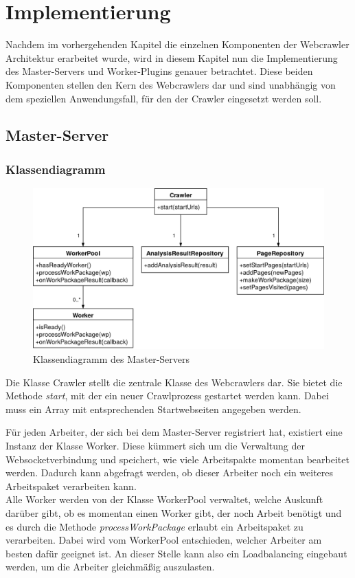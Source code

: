 \chapter{Implementierung}
Nachdem im vorhergehenden Kapitel die einzelnen Komponenten der Webcrawler Architektur erarbeitet wurde, wird in diesem Kapitel nun die Implementierung des Master-Servers und Worker-Plugins genauer betrachtet. Diese beiden Komponenten stellen den Kern des Webcrawlers dar und sind unabhängig von dem speziellen Anwendungsfall, für den der Crawler eingesetzt werden soll.
\section{Master-Server}
\subsection{Klassendiagramm}

\begin{figure}
	\centering
	\hspace*{-1cm}
	\includegraphics[width=1\textwidth]{Bilder/CrawlerKlassendiagramm.png}
	\caption{Klassendiagramm des Master-Servers}
\end{figure}

Die Klasse Crawler stellt die zentrale Klasse des Webcrawlers dar. Sie bietet die Methode \textit{start}, mit der ein neuer Crawlprozess gestartet werden kann. Dabei muss ein Array mit entsprechenden Startwebseiten angegeben werden. 

Für jeden Arbeiter, der sich bei dem Master-Server registriert hat, existiert eine Instanz der Klasse Worker. Diese kümmert sich um die Verwaltung der Websocketverbindung und speichert, wie viele Arbeitspakte momentan bearbeitet werden. Dadurch kann abgefragt werden, ob dieser Arbeiter noch ein weiteres Arbeitspaket verarbeiten kann. \\
Alle Worker werden von der Klasse WorkerPool verwaltet, welche Auskunft darüber gibt, ob es momentan einen Worker gibt, der noch Arbeit benötigt und es durch die Methode \textit{processWorkPackage} erlaubt ein Arbeitspaket zu verarbeiten. Dabei wird vom WorkerPool entschieden, welcher Arbeiter am besten dafür geeignet ist. An dieser Stelle kann also ein Loadbalancing eingebaut werden, um die Arbeiter gleichmäßig auszulasten.

